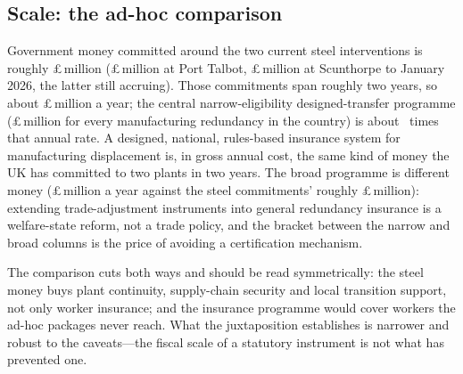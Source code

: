 \subsection{Scale: the ad-hoc comparison}

Government money committed around the two current steel interventions is
roughly \pounds\TaaSteelSupportTotal\,million
(\pounds\TaaSteelPortTalbot\,million at Port Talbot,
\pounds\TaaSteelScunthorpe\,million at Scunthorpe to January 2026, the
latter still accruing). Those commitments span roughly two years, so
about \pounds\TaaSteelPerYear\,million a year; the central
narrow-eligibility designed-transfer programme
(\pounds\TaaTotalABCCentralNarrow\,million for every manufacturing
redundancy in the country) is about \TaaABCMultipleSteelPerYear\ times
that annual rate. A designed,
national, rules-based insurance system for manufacturing displacement is,
in gross annual cost, the same kind of money the UK has committed to two
plants in two years. The broad programme is different money
(\pounds\TaaTotalABCCentralBroad\,million a year against the steel
commitments' roughly \pounds\TaaSteelPerYear\,million): extending
trade-adjustment instruments into general redundancy insurance is a
welfare-state reform, not a trade policy, and the bracket between the
narrow and broad columns is the price of avoiding a certification
mechanism.

The comparison cuts both ways and should be read symmetrically: the
steel money buys plant continuity, supply-chain security and local
transition support, not only worker insurance; and the insurance
programme would cover workers the ad-hoc packages never reach. What the
juxtaposition establishes is narrower and robust to the caveats---the
fiscal scale of a statutory instrument is not what has prevented one.
